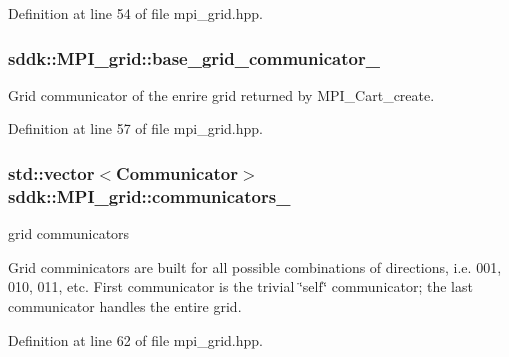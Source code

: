 Definition at line 54 of file mpi\+\_\+grid.\+hpp.

\hypertarget{classsddk_1_1_m_p_i__grid_a49d041be4378f955240145bfe9869f19}{}
\subsubsection[{base\+\_\+grid\+\_\+communicator\+\_\+}]{ sddk\+::\+M\+P\+I\+\_\+grid\+::base\+\_\+grid\+\_\+communicator\+\_\+\hspace{0.3cm}{\ttfamily [private]}}\label{classsddk_1_1_m_p_i__grid_a49d041be4378f955240145bfe9869f19}


Grid communicator of the enrire grid returned by M\+P\+I\+\_\+\+Cart\+\_\+create. 



Definition at line 57 of file mpi\+\_\+grid.\+hpp.

\hypertarget{classsddk_1_1_m_p_i__grid_a9afcd6e7fd32182f481e812593fdd430}{}
\subsubsection[{communicators\+\_\+}]{\setlength{\rightskip}{0pt plus 5cm}std\+::vector$<${\bf Communicator}$>$ sddk\+::\+M\+P\+I\+\_\+grid\+::communicators\+\_\+\hspace{0.3cm}{\ttfamily [private]}}\label{classsddk_1_1_m_p_i__grid_a9afcd6e7fd32182f481e812593fdd430}


grid communicators 

Grid comminicators are built for all possible combinations of directions, i.\+e. 001, 010, 011, etc. First communicator is the trivial \char`\"{}self\char`\"{} communicator; the last communicator handles the entire grid. 

Definition at line 62 of file mpi\+\_\+grid.\+hpp.

\hypertarget{classsddk_1_1_m_p_i__grid_af72671f0ea2a1d9e3f4e8d936623da7f}{}
